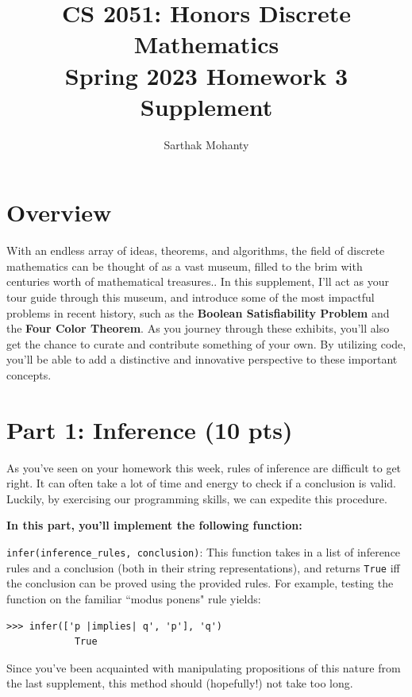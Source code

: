 \documentclass{article}
\title{\vspace{-1cm}CS 2051: Honors Discrete Mathematics \\Spring 2023 Homework 3 Supplement}
\author{Sarthak Mohanty}
\date{}
\begin{document}
\maketitle

\section*{Overview}
    With an endless array of ideas, theorems, and algorithms, the field of discrete mathematics can be thought of as a vast museum, filled to the brim with centuries worth of mathematical treasures.. In this supplement, I'll act as your tour guide through this museum, and introduce some of the most impactful problems in recent history, such as the \textbf{Boolean Satisfiability Problem} and the \textbf{Four Color Theorem}. As you journey through these exhibits, you'll also get the chance to curate and contribute something of your own. By utilizing code, you'll be able to add a distinctive and innovative perspective to these important concepts.

\section*{Part 1: Inference (10 pts)}
    As you've seen on your homework this week, rules of inference are difficult to get right. It can often take a lot of time and energy to check if a conclusion is valid. Luckily, by exercising our programming skills, we can expedite this procedure.

    \vspace{3mm}
    \textbf{In this part, you'll implement the following function:}
    \begin{tcolorbox}[colback=blue!10]
        \lstinline{infer(inference_rules, conclusion)}: This function takes in a list of inference rules and a conclusion (both in their string representations), and returns \verb+True+ iff the conclusion can be proved using the provided rules. For example, testing the function on the familiar ``modus ponens" rule yields:
        \begin{lstlisting}[belowskip=-10pt]
            >>> infer(['p |implies| q', 'p'], 'q')
            True
        \end{lstlisting}
    \end{tcolorbox}
    Since you've been acquainted with manipulating propositions of this nature from the last supplement, this method should (hopefully!) not take too long.

\vspace{-1mm}
\end{document}
